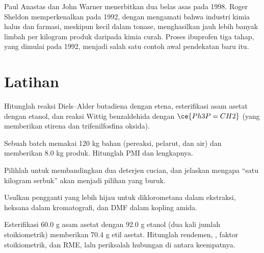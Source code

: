 \begin{history}
Paul Anastas dan John Warner menerbitkan dua belas asas  pada 1998. Roger Sheldon memperkenalkan  pada 1992, dengan mengamati bahwa
industri kimia halus dan farmasi, meskipun kecil dalam tonase,
menghasilkan jauh lebih banyak limbah per kilogram produk daripada kimia curah. Proses
ibuprofen tiga tahap, yang dimulai pada 1992, menjadi salah satu
contoh awal pendekatan baru itu.
\end{history}

\section{Latihan}

\begin{exercise}[$\star$]\label{exo:b3:green-industrial:1}
Hitunglah  reaksi Diels--Alder butadiena dengan etena,
esterifikasi asam asetat dengan etanol, dan reaksi Wittig
benzaldehida dengan $\ce{Ph3P=CH2}$ (yang memberikan stirena dan trifenilfosfina oksida).
\end{exercise}

\begin{exercise}[$\star$]\label{exo:b3:green-industrial:2}
Sebuah batch memakai 120 kg bahan (pereaksi, pelarut, dan air) dan memberikan 8.0 kg
produk. Hitunglah PMI dan  lengkapnya.
\end{exercise}

\begin{exercise}[$\star$]\label{exo:b3:green-industrial:3}
Pilihlah  untuk membandingkan dua deterjen cucian, dan jelaskan mengapa
``satu kilogram serbuk'' akan menjadi pilihan yang buruk.
\end{exercise}

\begin{exercise}[$\star$]\label{exo:b3:green-industrial:4}
Usulkan pengganti yang lebih hijau untuk diklorometana dalam ekstraksi, heksana dalam
kromatografi, dan DMF dalam kopling amida.
\end{exercise}

\begin{exercise}[$\star\star$]\label{exo:b3:green-industrial:5}
Esterifikasi 60.0 g asam asetat dengan 92.0 g etanol (dua kali
jumlah stoikiometrik) memberikan 70.4 g etil asetat. Hitunglah rendemen, , faktor stoikiometrik, dan RME, lalu periksalah hubungan di antara
keempatnya.
\end{exercise}

